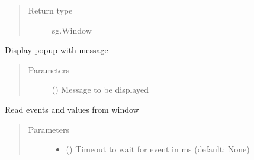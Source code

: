 \documentclass[letterpaper,10pt,english]{sphinxmanual}
\begin{document}
\begin{fulllineitems}
\begin{fulllineitems}
\begin{quote}
\begin{description}
\item[{Return type}] \leavevmode
\sphinxAtStartPar
sg.Window

\end{description}\end{quote}

\end{fulllineitems}


\begin{fulllineitems}
\label{\detokenize{interface:interface.Interface.popup}}
\sphinxAtStartPar
Display popup with message
\begin{quote}\begin{description}
\item[{Parameters}] \leavevmode
\sphinxAtStartPar
{} () \textendash{} Message to be displayed

\end{description}\end{quote}

\end{fulllineitems}


\begin{fulllineitems}
\label{\detokenize{interface:interface.Interface.read_events}}
\sphinxAtStartPar
Read events and values from window
\begin{quote}\begin{description}
\item[{Parameters}] \leavevmode\begin{itemize}
\item {} 
\sphinxAtStartPar
{} (\sphinxstyleliteralemphasis{\sphinxupquote{, }}) \textendash{} Timeout to wait for event in ms (default: None)


\end{itemize}
\end{description}
\end{quote}
\end{fulllineitems}
\end{fulllineitems}
\end{document}

